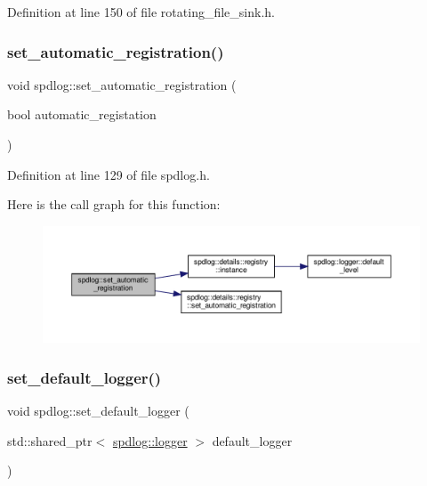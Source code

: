 Definition at line 150 of file rotating\+\_\+file\+\_\+sink.\+h.

\mbox{\label{namespacespdlog_a95b9f066c4e8ad65454049bdd7f6b956}} 
\subsubsection{\texorpdfstring{set\+\_\+automatic\+\_\+registration()}{set\_automatic\_registration()}}
{\footnotesize\ttfamily void spdlog\+::set\+\_\+automatic\+\_\+registration (\begin{DoxyParamCaption}\item[{bool}]{automatic\+\_\+registation }\end{DoxyParamCaption})\hspace{0.3cm}{\ttfamily [inline]}}



Definition at line 129 of file spdlog.\+h.

Here is the call graph for this function\+:
\nopagebreak
\begin{figure}[H]
\begin{center}
\leavevmode
\includegraphics[width=350pt]{namespacespdlog_a95b9f066c4e8ad65454049bdd7f6b956_cgraph}
\end{center}
\end{figure}
\mbox{\label{namespacespdlog_ab8a13bd805e706298e1e396ee5ac93bb}} 
\subsubsection{\texorpdfstring{set\+\_\+default\+\_\+logger()}{set\_default\_logger()}}
{\footnotesize\ttfamily void spdlog\+::set\+\_\+default\+\_\+logger (\begin{DoxyParamCaption}\item[{std\+::shared\+\_\+ptr$<$ \hyperlink{classspdlog_1_1logger}{spdlog\+::logger} $>$}]{default\+\_\+logger }\end{DoxyParamCaption})\hspace{0.3cm}{\ttfamily [inline]}}



